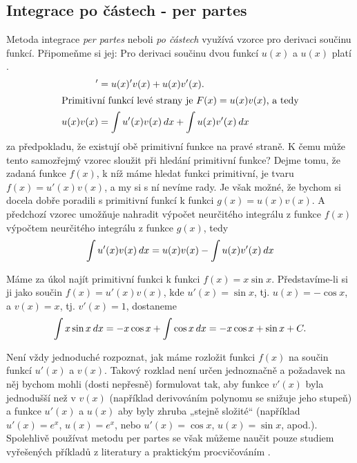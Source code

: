     \subsection{Integrace po částech - per partes}
      Metoda integrace \emph{per partes} neboli \emph{po částech} využívá vzorce pro derivaci 
      součinu funkcí. Připomeňme si jej: Pro derivaci součinu dvou funkcí \(u(x)\) a \(u(x)\) platí
      \cite[p.~137]{Musilova2009MA1}.
      \begin{align}
        [u(x)v(x)]' &= u(x)'v(x) + u(x)v'(x).  \label{MA:eq_Int29} \\
        \shortintertext{Primitivní funkcí levé strany je \(F(x) = u(x)v(x)\), a tedy}
        u(x)v(x)    &=  \int u'(x)v(x)\dx + \int u(x)v'(x)\dx \nonumber
      \end{align}  
      za předpokladu, že existují obě primitivní funkce na pravé straně. K čemu může tento 
      samozřejmý vzorec sloužit při hledání primitivní funkce? Dejme tomu, že zadaná funkce 
      \(f(x)\), k níž máme hledat funkci primitivní, je tvaru \(f(x) = u'(x)v(x)\), a my si s ní 
      nevíme rady. Je však možné, že bychom si docela dobře poradili s primitivní funkcí k funkci 
      \(g(x) = u(x)v(x)\). A předchozí vzorec umožňuje nahradit výpočet neurčitého integrálu z 
      funkce \(f(x)\) výpočtem neurčitého integrálu z funkce \(g(x)\), tedy
      \begin{equation}\label{ma:eq_perpartes}
        \int u'(x)v(x)\hspace{2pt}dx = u(x)v(x) - \int u(x)v'(x)\hspace{2pt}dx 
      \end{equation}
      \begin{example}
        Máme za úkol najít primitivní funkci k funkci \(f(x) = x\sin x\). Představíme-li si ji jako 
        součin \(f(x) = u'(x)v(x)\), kde \(u'(x) = \sin x\), tj. \(u(x) = -\cos x\), a \(v(x)= x\), 
        tj. \(v'(x) = 1\), dostaneme
        \begin{equation*}
          \int x\sin x\hspace{2pt}dx = -x\cos x + \int\cos x\hspace{2pt}dx = -x\cos x + \sin x + C.
        \end{equation*}          
      \end{example}
      Není vždy jednoduché rozpoznat, jak máme rozložit funkci \(f(x)\) na součin funkcí \(u'(x)\) 
      a \(v(x)\). Takový rozklad není určen jednoznačně a požadavek na něj bychom mohli (dosti 
      nepřesně) formulovat tak, aby funkce \(v'(x)\) byla jednodušší než v \(v(x)\) (například 
      derivováním polynomu se snižuje jeho stupeň) a funkce \(u'(x)\) a \(u(x)\) aby byly zhruba 
      „stejně složité“ (například \(u'(x) =e^x\), \(u(x) = e^x\), nebo \(u'(x) = \cos x\), \(u(x) = 
      \sin x\), apod.). Spolehlivě používat metodu per partes se však můžeme naučit pouze studiem 
      vyřešených příkladů z literatury a praktickým procvičováním \cite[p.~138]{Musilova2009MA1}.
      
